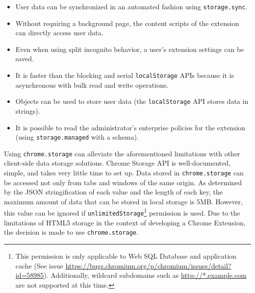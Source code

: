 \begin{itemize}
  \item User data can be synchronized in an automated fashion using \texttt{storage.sync}.
  \item Without requiring a background page, the content scripts of the extension can directly access user data.
  \item Even when using split incognito behavior, a user's extension settings can be saved.
  \item It is faster than the blocking and serial \texttt{localStorage} APIs because it is asynchronous with bulk read and write operations.
  \item Objects can be used to store user data (the \texttt{localStorage} API stores data in strings).
  \item It is possible to read the administrator's enterprise policies for the extension (using \texttt{storage.managed} with a schema).
\end{itemize}

Using \texttt{chrome.storage} can alleviate the aforementioned limitations with other client-side data storage solutions. Chrome Storage API is well-documented, simple, and takes very little time to set up. Data stored in \texttt{chrome.storage} can be accessed not only from tabs and windows of the same origin. As determined by the JSON stringification of each value and the length of each key, the maximum amount of data that can be stored in local storage is 5MB. However, this value can be ignored if \texttt{unlimitedStorage}\footnote{This permission is only applicable to Web SQL Database and application cache (See issue \url{https://bugs.chromium.org/p/chromium/issues/detail?id=58985}). Additionally, wildcard subdomains such as \url{http://*.example.com} are not supported at this time.} permission is used. Due to the limitations of HTML5 storage in the context of developing a Chrome Extension, the decision is made to use \texttt{chrome.storage}.
